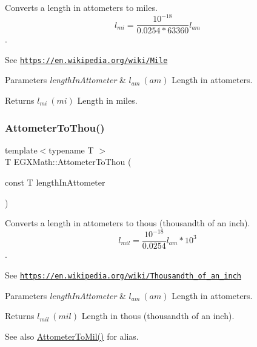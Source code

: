 Converts a length in attometers to miles. \[ l_{mi}=\frac{10^{-18}}{0.0254 * 63360} l_{am} \]. 

See \href{https://en.wikipedia.org/wiki/Mile}{\tt https\+://en.\+wikipedia.\+org/wiki/\+Mile} 
\begin{DoxyParams}{Parameters}
{\em length\+In\+Attometer} & $ l_{am}\ (am)$ Length in attometers. \\
\hline
\end{DoxyParams}
\begin{DoxyReturn}{Returns}
$ l_{mi}\ (mi)$ Length in miles. 
\end{DoxyReturn}
\mbox{\label{group___e_g_x_math-_conversions-_length_conversions-_s_i-_attometer-_imperial_gac9c9742b80b24da4e531fbcdc39976bb}} 
\subsubsection{\texorpdfstring{Attometer\+To\+Thou()}{AttometerToThou()}}
{\footnotesize\ttfamily template$<$typename T $>$ \\
T E\+G\+X\+Math\+::\+Attometer\+To\+Thou (\begin{DoxyParamCaption}\item[{const T}]{length\+In\+Attometer }\end{DoxyParamCaption})}



Converts a length in attometers to thous (thousandth of an inch). \[ l_{mil}= \frac{10^{-18}}{0.0254} l_{am} * 10^{3} \]. 

See \href{https://en.wikipedia.org/wiki/Thousandth_of_an_inch}{\tt https\+://en.\+wikipedia.\+org/wiki/\+Thousandth\+\_\+of\+\_\+an\+\_\+inch} 
\begin{DoxyParams}{Parameters}
{\em length\+In\+Attometer} & $ l_{am}\ (am)$ Length in attometers. \\
\hline
\end{DoxyParams}
\begin{DoxyReturn}{Returns}
$ l_{mil}\ (mil)$ Length in thous (thousandth of an inch). 
\end{DoxyReturn}
\begin{DoxySeeAlso}{See also}
\mbox{\hyperlink{group___e_g_x_math-_conversions-_length_conversions-_s_i-_attometer-_imperial_ga1ad78989a93e5316f787a6412e2c8e3a}{Attometer\+To\+Mil()}} for alias. 
\end{DoxySeeAlso}
\mbox{\label{group___e_g_x_math-_conversions-_length_conversions-_s_i-_attometer-_imperial_gaa88d881301681b0864a866ef45ad041c}} 
